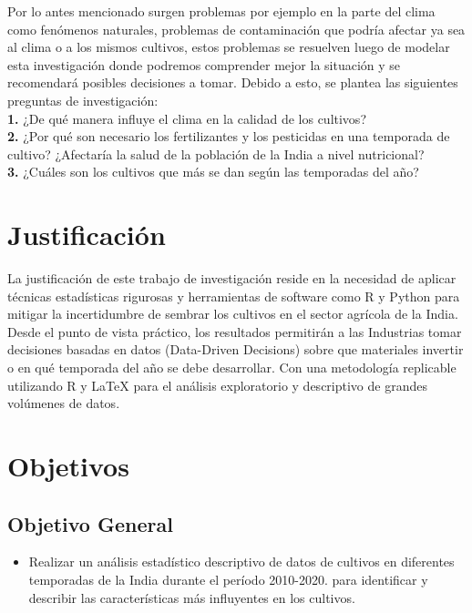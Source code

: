 \documentclass[oneside,11pt]{Latex/Classes/PhDthesisPSnPDF}
\begin{document}
Por lo antes mencionado surgen problemas por ejemplo en la parte del
clima como fenómenos naturales, problemas de contaminación que podría
afectar ya sea al clima o a los mismos cultivos, estos problemas se
resuelven luego de modelar esta investigación donde podremos comprender
mejor la situación y se recomendará posibles decisiones a tomar. Debido
a esto, se plantea las siguientes preguntas de investigación:\\

\textbf{1.} ¿De qué manera influye el clima en la calidad de los
cultivos?\\

\textbf{2.} ¿Por qué son necesario los fertilizantes y los pesticidas en
una temporada de cultivo? ¿Afectaría la salud de la población de la
India a nivel nutricional?\\

\textbf{3.} ¿Cuáles son los cultivos que más se dan según las temporadas
del año?\\

\section{Justificación}

La justificación de este trabajo de investigación reside en la necesidad
de aplicar técnicas estadísticas rigurosas y herramientas de software
como R y Python para mitigar la incertidumbre de sembrar los cultivos en
el sector agrícola de la India. Desde el punto de vista práctico, los
resultados permitirán a las Industrias tomar decisiones basadas en datos
(Data-Driven Decisions) sobre que materiales invertir o en qué temporada
del año se debe desarrollar. Con una metodología replicable utilizando R
y LaTeX para el análisis exploratorio y descriptivo de grandes volúmenes
de datos.\\

\section{Objetivos}

\subsection{Objetivo General}
\begin{itemize}
  \item{Realizar un análisis estadístico descriptivo de datos de cultivos en diferentes temporadas de la India durante el período 2010-2020.  para identificar y describir las características más influyentes en los cultivos.}
\end{itemize}
\end{document}
